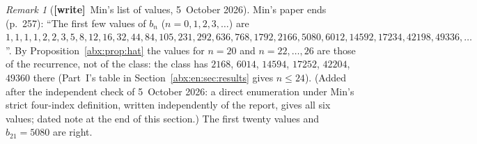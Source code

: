 \documentclass[11pt,letterpaper]{article}
\numberwithin{equation}{section}
\theoremstyle{remark}\newtheorem{remark}[theorem]{Remark}
\newcommand{\wtag}{\textup{\textbf{[write]}}}
\begin{document}
\begin{remark}[\wtag\ Min's list of values, 5~October 2026]\label{abx:rem:list}
Min's paper ends (p.~257): ``The first few values of $b_n$ ($n=0,1,2,3,\ldots$) are $1,\allowbreak 1,\allowbreak 1,\allowbreak 1,\allowbreak 2,\allowbreak 2,\allowbreak 3,\allowbreak 5,\allowbreak 8,\allowbreak 12,\allowbreak 16,\allowbreak 32,\allowbreak 44,\allowbreak 84,\allowbreak 105,\allowbreak 231,\allowbreak 292,\allowbreak 636,\allowbreak 768,\allowbreak 1792,\allowbreak 2166,\allowbreak 5080,\allowbreak 6012,\allowbreak 14592,\allowbreak 17234,\allowbreak 42198,\allowbreak 49336,\allowbreak \ldots$''. By Proposition~\ref{abx:prop:hat} the values for $n=20$ and $n=22,\ldots,26$ are those of the recurrence, not of the class: the class has $2168$, $6014$, $14594$, $17252$, $42204$, $49360$ there (Part~I's table in Section~\ref{abx:en:sec:results} gives $n\le24$). \textup{(Added after the independent check of 5~October 2026: a direct enumeration under Min's strict four-index definition, written independently of the report, gives all six values; dated note at the end of this section.)} The first twenty values and $b_{21}=5080$ are right.
\end{remark}
\end{document}
